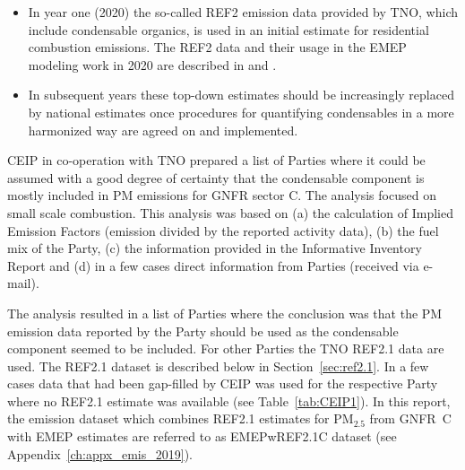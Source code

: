 \begin{itemize}
\item In year one (2020) the so-called REF2 emission data provided by TNO, which include condensable organics,  is used in an initial estimate for residential combustion emissions. The REF2 data and their usage in the EMEP modeling work in 2020 are described  in  \citet{R2020:CAMSREF2} and \citet{R2020:SVOC}. 
\item  In subsequent years these top-down estimates should be increasingly replaced by national estimates once procedures for quantifying condensables in a more harmonized way are agreed on and implemented.
\end{itemize}

CEIP in co-operation with TNO prepared a list of Parties where it could be assumed with a good degree of certainty that the condensable component is mostly included in PM emissions for GNFR sector C. The analysis focused on small scale combustion. This analysis was based on (a) the calculation of Implied Emission Factors (emission divided by the reported activity data), (b) the fuel mix of the Party, (c) the information provided in the Informative Inventory Report and (d) in a few cases direct information from Parties (received via e-mail).

The analysis resulted in a list of Parties where the conclusion was that the PM emission data reported by the Party should be used as the condensable component seemed to be included. For other Parties the TNO REF2.1 data are used. The REF2.1 dataset is described below in Section~\ref{sec:ref2.1}. In a few cases data that had been gap-filled by CEIP was used for the respective Party where no REF2.1 estimate was available (see Table~\ref{tab:CEIP1}). In this report, the emission dataset which combines REF2.1 estimates for PM$_{2.5}$ from GNFR~C with EMEP estimates are referred to as EMEPwREF2.1C dataset (see Appendix~\ref{ch:appx_emis_2019}). 




